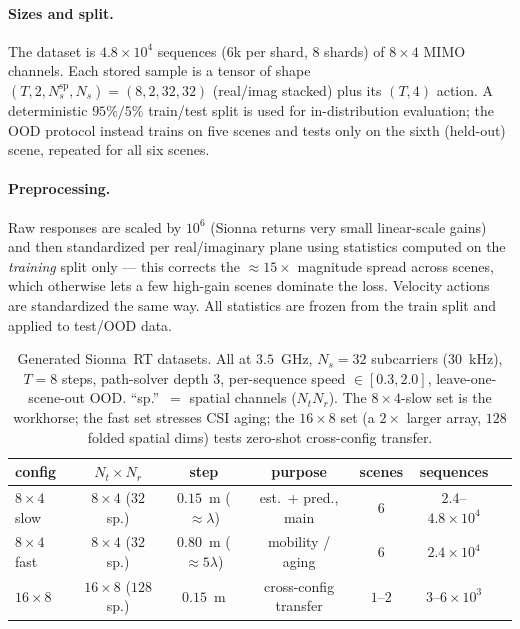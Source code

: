 \documentclass[11pt]{article}
\begin{document}
\paragraph{Sizes and split.} The dataset is $4.8{\times}10^4$ sequences ($6$k per shard, $8$ shards)
of $8\times4$ MIMO channels. Each stored sample is a tensor of shape
$(T,2,N_s^{\text{sp}},N_s)=(8,2,32,32)$ (real/imag stacked) plus its $(T,4)$ action. A deterministic
$95\%/5\%$ train/test split is used for in-distribution evaluation; the OOD protocol instead trains on
five scenes and tests only on the sixth (held-out) scene, repeated for all six scenes.

\paragraph{Preprocessing.} Raw responses are scaled by $10^6$ (Sionna returns very small linear-scale
gains) and then standardized per real/imaginary plane using statistics computed on the \emph{training}
split only --- this corrects the ${\approx}15\times$ magnitude spread across scenes, which otherwise
lets a few high-gain scenes dominate the loss. Velocity actions are standardized the same way. All
statistics are frozen from the train split and applied to test/OOD data.

\begin{table}[h]
\centering
\small
\begin{tabular}{lcccccc}
\toprule
config & $N_t\times N_r$ & step & purpose & scenes & sequences \\
\midrule
$8\times4$ slow  & $8\times4$ ($32$ sp.)  & $0.15$~m ($\approx\lambda$) & est.\ + pred., main & $6$ & $2.4$--$4.8{\times}10^4$ \\
$8\times4$ fast  & $8\times4$ ($32$ sp.)  & $0.80$~m ($\approx5\lambda$) & mobility / aging & $6$ & $2.4{\times}10^4$ \\
$16\times8$      & $16\times8$ ($128$ sp.)& $0.15$~m & cross-config transfer & $1$--$2$ & $3$--$6{\times}10^3$ \\
\bottomrule
\end{tabular}
\caption{Generated Sionna~RT datasets. All at $3.5$~GHz, $N_s{=}32$ subcarriers ($30$~kHz), $T{=}8$
steps, path-solver depth $3$, per-sequence speed $\in[0.3,2.0]$, leave-one-scene-out OOD. ``sp.''\ $=$
spatial channels ($N_tN_r$). The $8\times4$-slow set is the workhorse; the fast set stresses CSI aging;
the $16\times8$ set (a $2\times$ larger array, $128$ folded spatial dims) tests zero-shot cross-config
transfer.}
\label{tab:data}
\end{table}
\end{document}
